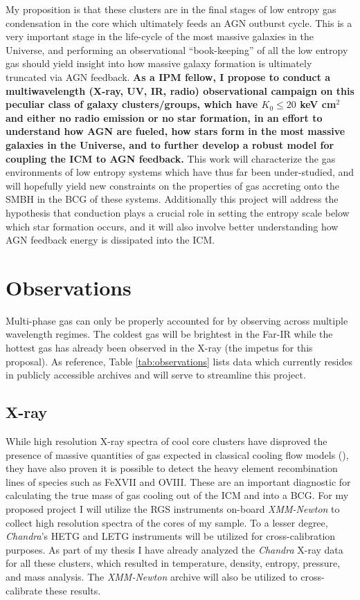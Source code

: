 \documentclass[11pt]{article}
\begin{document}
My proposition is that these clusters are in the final stages of low
entropy gas condensation in the core which ultimately feeds an AGN
outburst cycle. This is a very important stage in the
life-cycle of the most massive galaxies in the Universe, and
performing an observational ``book-keeping'' of all the low entropy gas
should yield insight into how massive galaxy formation is ultimately
truncated via AGN feedback. {\bf As a IPM fellow, I propose to
conduct a multiwavelength (X-ray, UV, IR, radio) observational
campaign on this peculiar class of galaxy clusters/groups, which have
$K_0 \leq 20$ keV cm$^2$ and either no radio emission or no star
formation, in an effort to understand how AGN are fueled, how stars
form in the most massive galaxies in the Universe, and to further
develop a robust model for coupling the ICM to AGN feedback.} This
work will characterize the gas environments of low entropy systems
which have thus far been under-studied, and will hopefully yield new
constraints on the properties of gas accreting onto the SMBH in the
BCG of these systems. Additionally this project will address the
hypothesis that conduction plays a crucial role in setting the entropy
scale below which star formation occurs, and it will also involve
better understanding how AGN feedback energy is dissipated into the
ICM.


\section{Observations}
Multi-phase gas can only be properly accounted for by observing across
multiple wavelength regimes. The coldest gas will be brightest in the
Far-IR while the hottest gas has already been observed in the X-ray
(the impetus for this proposal). As reference, Table
\ref{tab:observations} lists data which currently resides in publicly
accessible archives and will serve to streamline this project.

\subsection{X-ray}
While high resolution X-ray spectra of cool core clusters have
disproved the presence of massive quantities of gas expected in
classical cooling flow models (\cite{2006PhR...427....1P}), they have
also proven it is possible to detect the heavy element recombination lines
of species such as FeXVII and OVIII. These are an important
diagnostic for calculating the true mass of gas cooling out of the ICM
and into a BCG. For my proposed project I will utilize the RGS
instruments on-board {\it XMM-Newton} to collect high resolution
spectra of the cores of my sample. To a lesser degree, {\it Chandra}'s
HETG and LETG instruments will be utilized for cross-calibration
purposes. As part of my thesis I have already analyzed the {\it
Chandra} X-ray data for all these clusters, which resulted in
temperature, density, entropy, pressure, and mass analysis. The {\it
XMM-Newton} archive will also be utilized to cross-calibrate these
results.
\end{document}
